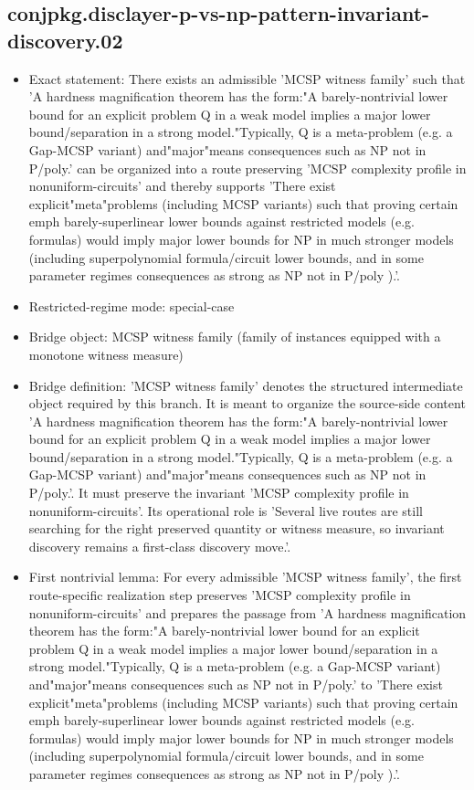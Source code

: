 \documentclass[11pt]{article}
\begin{document}
\subsection*{conjpkg.disclayer-p-vs-np-pattern-invariant-discovery.02}
\begin{itemize}
\item Exact statement: There exists an admissible 'MCSP witness family' such that 'A hardness magnification theorem has the form:"A barely-nontrivial lower bound for an explicit problem Q in a weak model implies a major lower bound/separation in a strong model."Typically, Q is a meta-problem (e.g. a Gap-MCSP variant) and"major"means consequences such as NP not in P/poly.' can be organized into a route preserving 'MCSP complexity profile in nonuniform-circuits' and thereby supports 'There exist explicit"meta"problems (including MCSP variants) such that proving certain emph barely-superlinear lower bounds against restricted models (e.g. formulas) would imply major lower bounds for NP in much stronger models (including superpolynomial formula/circuit lower bounds, and in some parameter regimes consequences as strong as NP not in P/poly ).'.
\item Restricted-regime mode: special-case
\item Bridge object: MCSP witness family (family of instances equipped with a monotone witness measure)
\item Bridge definition: 'MCSP witness family' denotes the structured intermediate object required by this branch. It is meant to organize the source-side content 'A hardness magnification theorem has the form:"A barely-nontrivial lower bound for an explicit problem Q in a weak model implies a major lower bound/separation in a strong model."Typically, Q is a meta-problem (e.g. a Gap-MCSP variant) and"major"means consequences such as NP not in P/poly.'. It must preserve the invariant 'MCSP complexity profile in nonuniform-circuits'. Its operational role is 'Several live routes are still searching for the right preserved quantity or witness measure, so invariant discovery remains a first-class discovery move.'.
\item First nontrivial lemma: For every admissible 'MCSP witness family', the first route-specific realization step preserves 'MCSP complexity profile in nonuniform-circuits' and prepares the passage from 'A hardness magnification theorem has the form:"A barely-nontrivial lower bound for an explicit problem Q in a weak model implies a major lower bound/separation in a strong model."Typically, Q is a meta-problem (e.g. a Gap-MCSP variant) and"major"means consequences such as NP not in P/poly.' to 'There exist explicit"meta"problems (including MCSP variants) such that proving certain emph barely-superlinear lower bounds against restricted models (e.g. formulas) would imply major lower bounds for NP in much stronger models (including superpolynomial formula/circuit lower bounds, and in some parameter regimes consequences as strong as NP not in P/poly ).'.

\end{itemize}
\end{document}
